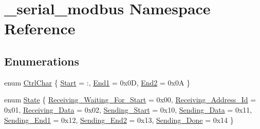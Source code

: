 \hypertarget{namespace__serial__modbus}{}\section{\+\_\+serial\+\_\+modbus Namespace Reference}
\label{namespace__serial__modbus}
\subsection*{Enumerations}
\begin{DoxyCompactItemize}
\item 
enum \hyperlink{namespace__serial__modbus_a5b967b79f82bb6863cae05015a79b4a3}{Ctrl\+Char} \{ \newline
\hyperlink{namespace__serial__modbus_a5b967b79f82bb6863cae05015a79b4a3a7da1eac79d11437436ff33ccf3302001}{Start} = \textquotesingle{}\+:\textquotesingle{}, 
\newline
\hyperlink{namespace__serial__modbus_a5b967b79f82bb6863cae05015a79b4a3a08adce699bd0380a36a2d42bd3d1d528}{End1} = 0x0D, 
\newline
\hyperlink{namespace__serial__modbus_a5b967b79f82bb6863cae05015a79b4a3a3cc6a853513464b0bce1dd22df8b32ed}{End2} = 0x0A
 \}
\item 
enum \hyperlink{namespace__serial__modbus_ab3c10a855665a020824d760dbfa5d19e}{State} \{ \newline
\hyperlink{namespace__serial__modbus_ab3c10a855665a020824d760dbfa5d19eaea59e9109888f82f2aef22039cc66608}{Receiving\+\_\+\+Waiting\+\_\+\+For\+\_\+\+Start} = 0x00, 
\newline
\hyperlink{namespace__serial__modbus_ab3c10a855665a020824d760dbfa5d19ea20c78457d43d4cc8c9a891830a8f2f28}{Receiving\+\_\+\+Address\+\_\+\+Id} = 0x01, 
\newline
\hyperlink{namespace__serial__modbus_ab3c10a855665a020824d760dbfa5d19eaee1c70ef3520c51137f44315e4f57065}{Receiving\+\_\+\+Data} = 0x02, 
\newline
\hyperlink{namespace__serial__modbus_ab3c10a855665a020824d760dbfa5d19ea26bc35fcef2c92e6b01372cd6961ef77}{Sending\+\_\+\+Start} = 0x10, 
\newline
\hyperlink{namespace__serial__modbus_ab3c10a855665a020824d760dbfa5d19eab14e58952e262904b79e6cd05feee1f8}{Sending\+\_\+\+Data} = 0x11, 
\newline
\hyperlink{namespace__serial__modbus_ab3c10a855665a020824d760dbfa5d19eac87effd06485375de9741f5a4b49ef38}{Sending\+\_\+\+End1} = 0x12, 
\newline
\hyperlink{namespace__serial__modbus_ab3c10a855665a020824d760dbfa5d19ea5cd5d88dabacc809fd9c6f14cad86979}{Sending\+\_\+\+End2} = 0x13, 
\newline
\hyperlink{namespace__serial__modbus_ab3c10a855665a020824d760dbfa5d19ea2b53d386d60039531eb07a8b484212f4}{Sending\+\_\+\+Done} = 0x14
 \}
\end{DoxyCompactItemize}


